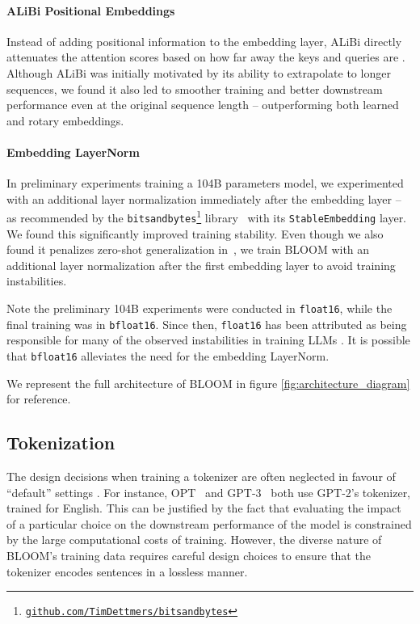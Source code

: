 \paragraph{ALiBi Positional Embeddings} Instead of adding positional information to the embedding layer, ALiBi directly attenuates the attention scores based on how far away the keys and queries are \citep{press2021train}. Although ALiBi was initially motivated by its ability to extrapolate to longer sequences, we found it also led to smoother training and better downstream performance even at the original sequence length -- outperforming both learned \citep{vaswani2017attention} and rotary \citep{su2021roformer} embeddings.

\paragraph{Embedding LayerNorm} In preliminary experiments training a 104B parameters model, we experimented with an additional layer normalization immediately after the embedding layer -- as recommended by the \texttt{bitsandbytes}\footnote{\href{https://github.com/TimDettmers/bitsandbytes}{\texttt{github.com/TimDettmers/bitsandbytes}}} library~\citep{dettmers2022llm} with its \texttt{StableEmbedding} layer. We found this significantly improved training stability. Even though we also found it penalizes zero-shot generalization in~\citet{scao2022what}, we train BLOOM with an additional layer normalization after the first embedding layer to avoid training instabilities.

Note the preliminary 104B experiments were conducted in \texttt{float16}, while the final training was in \texttt{bfloat16}. Since then, \texttt{float16} has been attributed as being responsible for many of the observed instabilities in training LLMs \citep{zhang2022opt, zeng2022glm}. It is possible that \texttt{bfloat16} alleviates the need for the embedding LayerNorm.

We represent the full architecture of BLOOM in figure \ref{fig:architecture_diagram} for reference.

\subsection{Tokenization}
\label{sec:tokenization}

The design decisions when training a tokenizer are often neglected in favour of ``default'' settings \citep{mielke2021between}. For instance, OPT~\citep{zhang2022opt} and GPT-3~\citep{brown2020language} both use GPT-2's tokenizer, trained for English. This can be justified by the fact that evaluating the impact of a particular choice on the downstream performance of the model is constrained by the large computational costs of training. However, the diverse nature of BLOOM's training data requires careful design choices to ensure that the tokenizer encodes sentences in a lossless manner.

